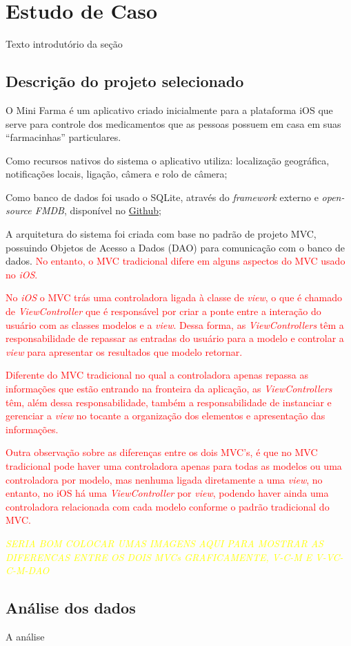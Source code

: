 \chapter{Estudo de Caso} \label{estudodecaso}

Texto introdutório da seção

\section{Descrição do projeto selecionado} \label{subsec:descricaodoprojeto}

O Mini Farma é um aplicativo criado inicialmente para a plataforma iOS que serve para controle dos medicamentos que as 
pessoas possuem em casa em suas ``farmacinhas'' particulares.


Como recursos nativos do sistema o aplicativo utiliza: localização geográfica, notificações locais, ligação, câmera e rolo de câmera;


Como banco de dados foi usado o SQLite, através do \textit{framework} externo e \textit{open-source FMDB}, 
disponível no \href{https://github.com/ccgus/fmdb}{Github};

A arquitetura do sistema foi criada com base no padrão de projeto MVC, possuindo Objetos de Acesso a Dados (DAO) para comunicação 
com o banco de dados. \textcolor{red}{No entanto, o MVC tradicional difere em alguns aspectos do MVC usado no \textit{iOS}.} 

\textcolor{red}{No \textit{iOS} o MVC trás uma controladora ligada à classe de \textit{view}, o que é chamado de \textit{ViewController} que é responsável por 
criar a ponte entre a interação do usuário com as classes modelos e a \textit{view}. Dessa forma, as \textit{ViewControllers} têm a 
responsabilidade de repassar as entradas do usuário para a modelo e controlar a \textit{view} para apresentar os resultados que modelo retornar.}


\textcolor{red}{Diferente do MVC tradicional no qual a controladora apenas repassa as informações que estão entrando na fronteira da aplicação, 
as \textit{ViewControllers} têm, além dessa responsabilidade, também a responsabilidade de instanciar e gerenciar a \textit{view} no tocante
a organização dos elementos e apresentação das informações.}


\textcolor{red}{Outra observação sobre as diferenças entre os dois MVC's, é que no MVC tradicional pode haver uma controladora apenas 
para todas as modelos ou uma controladora por modelo, mas nenhuma ligada diretamente a uma \textit{view}, no entanto, no iOS há uma 
\textit{ViewController} por \textit{view}, podendo haver ainda uma controladora relacionada com cada modelo conforme o padrão tradicional do MVC.}

\textcolor{yellow}{\textit{SERIA BOM COLOCAR UMAS IMAGENS AQUI PARA MOSTRAR AS DIFERENCAS ENTRE OS DOIS MVCs GRAFICAMENTE, V-C-M E V-VC-C-M-DAO}}

\section{Análise dos dados} \label{sec:analise}

A análise